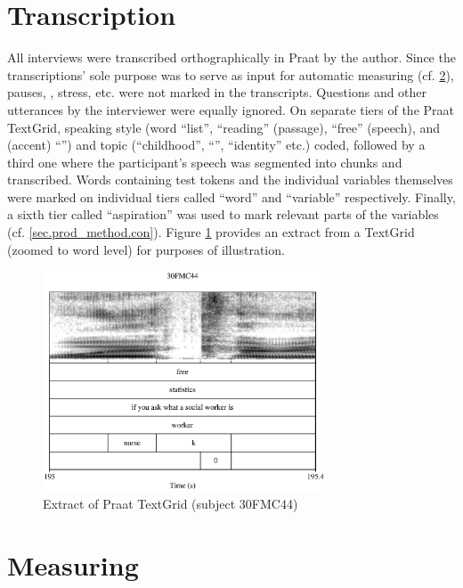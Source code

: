 	\section{Transcription}\label{sec.prod_method.transcription}

All interviews were transcribed orthographically in Praat \parencite{praat} by the author.
Since the transcriptions' sole purpose was to serve as input for automatic measuring (cf. \ref{sec.prod_method.measuring}), pauses, , stress, etc. were not marked in the transcripts.
Questions and other utterances by the interviewer were equally ignored.
On separate tiers of the Praat TextGrid, speaking style (word ``list'', ``reading'' (passage), ``free'' (speech), and (accent) ``'') and topic (``childhood'', ``'', ``identity'' etc.) coded, followed by a third one where the participant's speech was segmented into chunks and transcribed.
Words containing test tokens and the individual variables themselves were marked on individual tiers called ``word'' and ``variable'' respectively.
Finally, a sixth tier called ``aspiration'' was used to mark relevant parts of the  variables (cf. \ref{sec.prod_method.con}).
Figure \ref{fig.textgrid.ex} provides an extract from a TextGrid (zoomed to word level) for purposes of illustration.

	\begin{figure}[h]
		\centering
			\centering
			\includegraphics[width=0.75\textwidth]{figures/TextGrid_screenshot}
		\caption{Extract of Praat TextGrid (subject 30FMC44)}
		\label{fig.textgrid.ex}
	\end{figure}

	\section{Measuring}\label{sec.prod_method.measuring}

